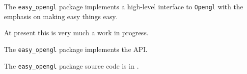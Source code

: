 
The {\tt easy\_opengl} package implements a high-level interface to 
{\tt Opengl} with the emphasis on making easy things easy.

At present this is very much a work in progress.

The {\tt easy\_opengl} package implements the  API.

The {\tt easy\_opengl} package source code is in .



